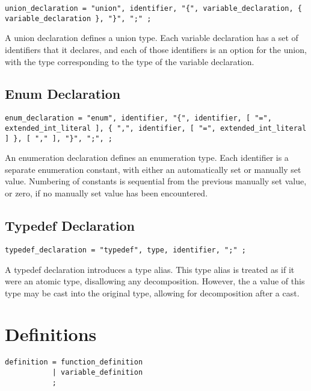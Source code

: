 \documentclass[letterpaper,12pt]{book}
\begin{document}
\begin{lstlisting}[breaklines=true]
union_declaration = "union", identifier, "{", variable_declaration, { variable_declaration }, "}", ";" ;
\end{lstlisting}

A union declaration defines a union type. Each variable declaration has a set of identifiers that it declares, and each of those identifiers is an option for the union, with the type corresponding to the type of the variable declaration.

\section{Enum Declaration}

\begin{lstlisting}[breaklines=true]
enum_declaration = "enum", identifier, "{", identifier, [ "=", extended_int_literal ], { ",", identifier, [ "=", extended_int_literal ] }, [ "," ], "}", ";", ;
\end{lstlisting}

An enumeration declaration defines an enumeration type. Each identifier is a separate enumeration constant, with either an automatically set or manually set value. Numbering of constants is sequential from the previous manually set value, or zero, if no manually set value has been encountered.

\section{Typedef Declaration}

\begin{lstlisting}[breaklines=true]
typedef_declaration = "typedef", type, identifier, ";" ;
\end{lstlisting}

A typedef declaration introduces a type alias. This type alias is treated as if it were an atomic type, disallowing any decomposition. However, the a value of this type may be cast into the original type, allowing for decomposition after a cast.

\chapter{Definitions}

\begin{lstlisting}[breaklines=true]
definition = function_definition
           | variable_definition
           ;
\end{lstlisting}
\end{document}
